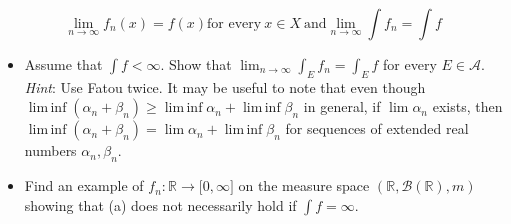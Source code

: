 \[\lim\limits_{n\rightarrow\infty}f_{n}(x) = f(x)\text{for every}\ x \in X\ \text{and}\lim\limits_{n\rightarrow\infty}\int f_{n} = \int f\]

\begin{itemize}
\item
  Assume that \(\int f < \infty\). Show that \(\lim_{n\rightarrow\infty}\int_{E}f_{n} = \int_{E}f\) for every \(E \in \mathcal{A}\). \emph{Hint}: Use Fatou twice. It may be useful to note that even though \(\operatorname{lim\, inf}(\alpha_{n} + \beta_{n}) \geq \operatorname{lim\, inf}\alpha_{n} + \operatorname{lim\, inf}\beta_{n}\) in general, if \(\lim\alpha_{n}\) exists, then \(\operatorname{lim\, inf}(\alpha_{n} + \beta_{n}) = \lim\alpha_{n} + \operatorname{lim\, inf}\beta_{n}\) for sequences of extended real numbers \(\alpha_{n},\beta_{n}\).
\item
  Find an example of \(f_{n}:\mathbb{R}\rightarrow\lbrack 0,\infty\rbrack\) on the measure space \((\mathbb{R},\mathcal{B}(\mathbb{R}),m)\) showing that (a) does not necessarily hold if \(\int f = \infty\).
\end{itemize}

